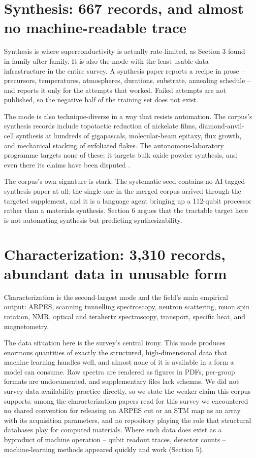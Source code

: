 \documentclass[
  11pt,
]{article}
\newcounter{none} %
\begin{document}
\section{Synthesis: 667 records, and almost no machine-readable
trace}\label{synthesis-667-records-and-almost-no-machine-readable-trace}

Synthesis is where superconductivity is actually rate-limited, as
Section 3 found in family after family. It is also the mode with the
least usable data infrastructure in the entire survey. A synthesis paper
reports a recipe in prose -- precursors, temperatures, atmospheres,
durations, substrate, annealing schedule -- and reports it only for the
attempts that worked. Failed attempts are not published, so the negative
half of the training set does not exist.

The mode is also technique-diverse in a way that resists automation. The
corpus's synthesis records include topotactic reduction of nickelate
films, diamond-anvil-cell synthesis at hundreds of gigapascals,
molecular-beam epitaxy, flux growth, and mechanical stacking of
exfoliated flakes. The autonomous-laboratory programme
\citep{szymanski2023autonomous} targets none of these; it targets bulk
oxide powder synthesis, and even there its claims have been disputed
\citep{leeman2024challenges}.

The corpus's own signature is stark. The systematic seed contains no
AI-tagged synthesis paper at all; the single one in the merged corpus
arrived through the targeted supplement, and it is a language agent
bringing up a 112-qubit processor rather than a materials synthesis.
Section 6 argues that the tractable target here is not automating
synthesis but predicting synthesizability.

\section{Characterization: 3,310 records, abundant data in unusable
form}\label{characterization-3310-records-abundant-data-in-unusable-form}

Characterization is the second-largest mode and the field's main
empirical output: ARPES, scanning tunnelling spectroscopy, neutron
scattering, muon spin rotation, NMR, optical and terahertz spectroscopy,
transport, specific heat, and magnetometry.

The data situation here is the survey's central irony. This mode
produces enormous quantities of exactly the structured, high-dimensional
data that machine learning handles well, and almost none of it is
available in a form a model can consume. Raw spectra are rendered as
figures in PDFs, per-group formats are undocumented, and supplementary
files lack schemas. We did not survey data-availability practice
directly, so we state the weaker claim this corpus supports: among the
characterization papers read for this survey we encountered no shared
convention for releasing an ARPES cut or an STM map as an array with its
acquisition parameters, and no repository playing the role that
structural databases play for computed materials. Where such data does
exist as a byproduct of machine operation -- qubit readout traces,
detector counts -- machine-learning methods appeared quickly and work
(Section 5).
\end{document}
